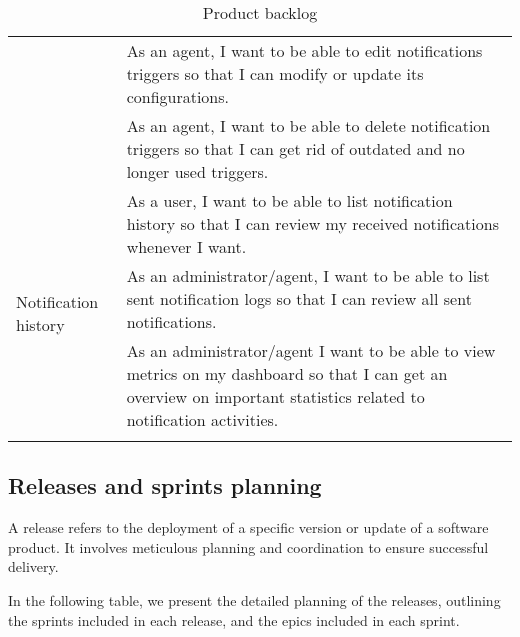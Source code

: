 \begin{longtable}{ | m{}  | m{} | }
      \cline{2-2}
                                                              & As an agent, I want to be able to edit notifications triggers so that I can modify or update its configurations.                                                      \\
      \cline{2-2}
                                                              & As an agent, I want to be able to delete notification triggers so that I can get rid of outdated and no longer used triggers.                                         \\
      \hline
      \multirow[t]{4}{5em}{Notification history}              & As a user, I want to be able to list notification history so that I can review my received notifications whenever I want.                                             \\
      \cline{2-2}
                                                              & As an administrator/agent, I want to be able to list sent notification logs so that I can review all sent notifications.                                              \\
      \hline
      Dashboard                                               & As an administrator/agent I want to be able to view metrics on my dashboard so that I can get an overview on important statistics related to notification activities. \\
      \hline
      \caption{Product backlog}
\end{longtable}

\subsection{Releases and sprints planning}
A release refers to the deployment of a specific version or update of a software product. It involves meticulous planning
and coordination to ensure successful delivery.

In the following table, we present the detailed planning of the releases, outlining the sprints included in each release,
and the epics included in each sprint. \\

